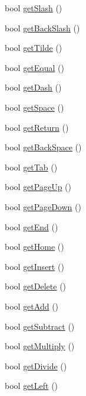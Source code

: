 \begin{DoxyCompactItemize}
\item 
bool \hyperlink{class_update_data_a1964067324c67d8a67eb5795df7e2106}{get\-Slash} ()
\item 
bool \hyperlink{class_update_data_a061aba13ecec0d6bb57562ee0bf745cb}{get\-Back\-Slash} ()
\item 
bool \hyperlink{class_update_data_a107f1e0423fe1c6ef10736e5aaa73139}{get\-Tilde} ()
\item 
bool \hyperlink{class_update_data_a2ee6261586acff67a677a22a06915355}{get\-Equal} ()
\item 
bool \hyperlink{class_update_data_a9eb4ec42e0c1e43ea26738b1045fb4bd}{get\-Dash} ()
\item 
bool \hyperlink{class_update_data_a37643768c5a5c0c1344087cbfb7f9c4b}{get\-Space} ()
\item 
bool \hyperlink{class_update_data_a2b4ecdaf41998df3072a931bddc5d98c}{get\-Return} ()
\item 
bool \hyperlink{class_update_data_a98e961e1f1dd9ac3d55595f1599d4b5c}{get\-Back\-Space} ()
\item 
bool \hyperlink{class_update_data_a0f504003d4e2b5bc6ecacace1d03b7b0}{get\-Tab} ()
\item 
bool \hyperlink{class_update_data_ad54388e377a99455abcd0e3b73c00c03}{get\-Page\-Up} ()
\item 
bool \hyperlink{class_update_data_a1074c3a9f2ad7f49602385e3c3123360}{get\-Page\-Down} ()
\item 
bool \hyperlink{class_update_data_a2d85d14cb612dde8a99b45d50c31bbf4}{get\-End} ()
\item 
bool \hyperlink{class_update_data_a4112e564ca3a7d01a65c1984431944bd}{get\-Home} ()
\item 
bool \hyperlink{class_update_data_a8b2a99c437be1674da5abb9961287374}{get\-Insert} ()
\item 
bool \hyperlink{class_update_data_a84816fde434b28fd9682a6089142dd01}{get\-Delete} ()
\item 
bool \hyperlink{class_update_data_a3e17439d9e09d1cee639300d540e4fa5}{get\-Add} ()
\item 
bool \hyperlink{class_update_data_aa0f64dfb0841a6c9001bac694dd20184}{get\-Subtract} ()
\item 
bool \hyperlink{class_update_data_aac430af808de21f96b13651973b9e0fe}{get\-Multiply} ()
\item 
bool \hyperlink{class_update_data_a291e35fbedf25986a393f38a596e566f}{get\-Divide} ()
\item 
bool \hyperlink{class_update_data_aa7e8fb2ee5945c4e75705e1bc66a506d}{get\-Left} ()

\end{DoxyCompactItemize}
